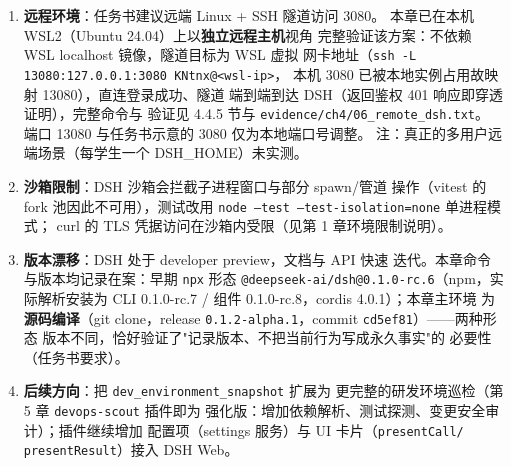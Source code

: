 \begin{enumerate}[leftmargin=4em,itemsep=0pt,topsep=2pt]
    \item \textbf{远程环境}：任务书建议远端 Linux + SSH 隧道访问 3080。
          本章已在本机 WSL2（Ubuntu 24.04）上以\textbf{独立远程主机}视角
          完整验证该方案：不依赖 WSL localhost 镜像，隧道目标为 WSL 虚拟
          网卡地址（\texttt{ssh -L 13080:127.0.0.1:3080 KNtnx@<wsl-ip>}，
          本机 3080 已被本地实例占用故映射 13080），直连登录成功、隧道
          端到端到达 DSH（返回鉴权 401 响应即穿透证明），完整命令与
          验证见 4.4.5 节与 \nolinkurl{evidence/ch4/06_remote_dsh.txt}。
          端口 13080 与任务书示意的 3080 仅为本地端口号调整。
          注：真正的多用户远端场景（每学生一个 DSH\_HOME）未实测。
    \item \textbf{沙箱限制}：DSH 沙箱会拦截子进程窗口与部分 spawn/管道
          操作（vitest 的 fork 池因此不可用），测试改用
          \texttt{node --test --test-isolation=none} 单进程模式；
          curl 的 TLS 凭据访问在沙箱内受限（见第 1 章环境限制说明）。
    \item \textbf{版本漂移}：DSH 处于 developer preview，文档与 API 快速
          迭代。本章命令与版本均记录在案：早期 \texttt{npx} 形态
          \texttt{@deepseek-ai/dsh@0.1.0-rc.6}（npm，实际解析安装为
          CLI 0.1.0-rc.7 / 组件 0.1.0-rc.8，cordis 4.0.1）；本章主环境
          为\textbf{源码编译}（git clone，release
          \texttt{0.1.2-alpha.1}，commit \texttt{cd5ef81}）——两种形态
          版本不同，恰好验证了"记录版本、不把当前行为写成永久事实"的
          必要性（任务书要求）。
    \item \textbf{后续方向}：把 \texttt{dev\_environment\_snapshot} 扩展为
          更完整的研发环境巡检（第 5 章 \texttt{devops-scout} 插件即为
          强化版：增加依赖解析、测试探测、变更安全审计）；插件继续增加
          配置项（settings 服务）与 UI 卡片（\texttt{presentCall/
          presentResult}）接入 DSH Web。
\end{enumerate}


